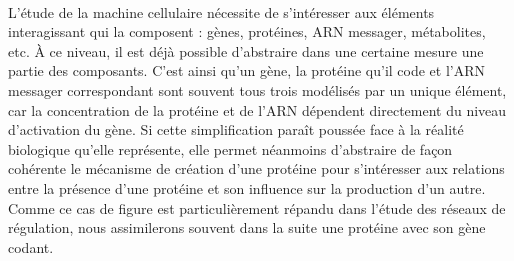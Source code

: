 \\

L'étude de la machine cellulaire nécessite de s'intéresser aux éléments interagissant
qui la composent :
gènes, protéines, ARN messager, métabolites, etc.
% 
À ce niveau, il est déjà possible d'abstraire dans une certaine mesure
une partie des composants.
C'est ainsi qu'un gène, la protéine qu'il code et l'ARN messager correspondant sont
souvent tous trois modélisés par un unique élément,
car la concentration de la protéine et de l'ARN
dépendent directement du niveau d'activation du gène.
Si cette simplification paraît poussée face à la réalité biologique qu'elle représente,
elle permet néanmoins d'abstraire de façon cohérente le mécanisme de création d'une protéine
pour s'intéresser aux relations
entre la présence d'une protéine et son influence sur la production d'un autre.
Comme ce cas de figure est particulièrement répandu dans l'étude des réseaux de régulation,
nous assimilerons souvent dans la suite une protéine avec son gène codant.

